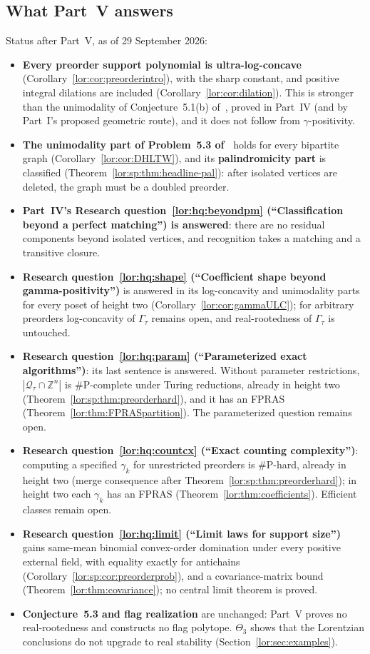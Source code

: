 \documentclass[11pt]{article}
\numberwithin{equation}{section}
\theoremstyle{definition}
\newcommand{\Z}{\mathbb Z}
\newcommand{\Qt}{\mathcal Q_\tau}
\begin{document}
\subsection{What Part~V answers}
\label{lor:sec:answers}
Status after Part~V, as of 29 September 2026:
\begin{itemize}[leftmargin=1.4em]
\item \textbf{Every preorder support polynomial is ultra-log-concave}
(Corollary~\ref{lor:cor:preorderintro}), with the sharp constant, and
positive integral dilations are included (Corollary~\ref{lor:cor:dilation}).
This is stronger than the unimodality of Conjecture~5.1(b) of~\cite{AC},
proved in Part~IV (and by Part~I's proposed geometric route), and it does not follow from $\gamma$-positivity.
\item \textbf{The unimodality part of Problem~5.3 of~\cite{DHLTW}} holds for
every bipartite graph (Corollary~\ref{lor:cor:DHLTW}), and its
\textbf{palindromicity part} is classified
(Theorem~\ref{lor:sp:thm:headline-pal}): after isolated vertices are
deleted, the graph must be a doubled preorder.
\item \textbf{Part~IV's Research question~\ref{lor:hq:beyondpm}
(``Classification beyond a perfect matching'') is answered}: there are no
residual components beyond isolated vertices, and recognition takes a
matching and a transitive closure.
\item \textbf{Research question~\ref{lor:hq:shape} (``Coefficient shape
beyond gamma-positivity'')} is answered in its log-concavity and unimodality
parts for every poset of height two (Corollary~\ref{lor:cor:gammaULC}); for
arbitrary preorders log-concavity of $\Gamma_\tau$ remains open, and
real-rootedness of $\Gamma_\tau$ is untouched.
\item \textbf{Research question~\ref{lor:hq:param} (``Parameterized exact
algorithms'')}: its last sentence is answered. Without parameter
restrictions, $|\Qt\cap\Z^n|$ is $\#\mathrm P$-complete under Turing
reductions, already in height two (Theorem~\ref{lor:sp:thm:preorderhard}),
and it has an FPRAS (Theorem~\ref{lor:thm:FPRASpartition}). The
parameterized question remains open.
\item \textbf{Research question~\ref{lor:hq:countcx} (``Exact counting
complexity'')}: computing a specified $\gamma_k$ for unrestricted preorders
is $\#\mathrm P$-hard, already in height two (merge consequence after
Theorem~\ref{lor:sp:thm:preorderhard}); in height two each $\gamma_k$ has an
FPRAS (Theorem~\ref{lor:thm:coefficients}). Efficient classes remain open.
\item \textbf{Research question~\ref{lor:hq:limit} (``Limit laws for support
size'')} gains same-mean binomial convex-order domination under every
positive external field, with equality exactly for antichains
(Corollary~\ref{lor:sp:cor:preorderprob}), and a covariance-matrix bound
(Theorem~\ref{lor:thm:covariance}); no central limit theorem is proved.
\item \textbf{Conjecture~5.3 and flag realization} are unchanged: Part~V
proves no real-rootedness and constructs no flag polytope. $\Theta_3$ shows
that the Lorentzian conclusions do not upgrade to real stability
(Section~\ref{lor:sec:examples}).
\end{itemize}
\end{document}
